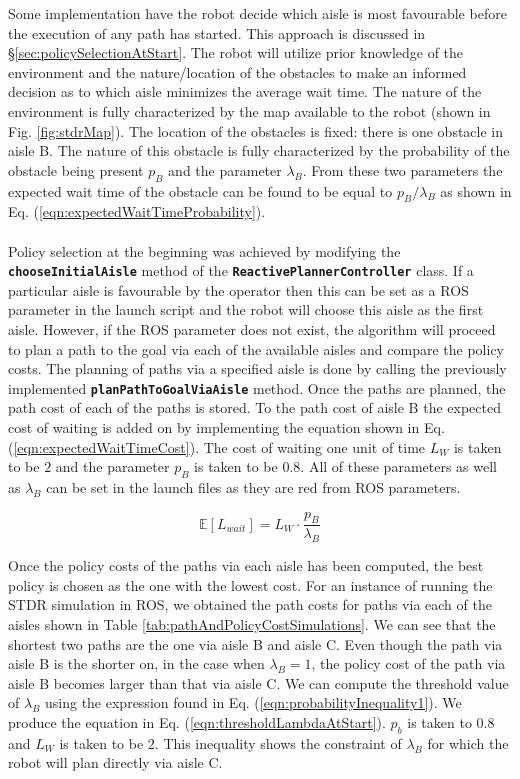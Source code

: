 \documentclass[a4paper,12pt]{article}
\begin{document}
		Some implementation have the robot decide which aisle is most favourable before the execution of any path has started. This approach is discussed in \S \ref{sec:policySelectionAtStart}. The robot will utilize prior knowledge of the environment and the nature/location of the obstacles to make an informed decision as to which aisle minimizes the average wait time. The nature of the environment is fully characterized by the map available to the robot (shown in Fig. \ref{fig:stdrMap}). The location of the obstacles is fixed: there is one obstacle in aisle B. The nature of this obstacle is fully characterized by the probability of the obstacle being present $p_B$ and the parameter $\lambda_B$. From these two parameters the expected wait time of the obstacle can be found to be equal to $p_B/\lambda_B$ as shown in Eq. (\ref{eqn:expectedWaitTimeProbability}).
		\\
		\\
		Policy selection at the beginning was achieved by modifying the \textbf{\texttt{chooseInitialAisle}} method of the \textbf{\texttt{ReactivePlannerController}} class. If a particular aisle is favourable by the operator then this can be set as a ROS parameter in the launch script and the robot will choose this aisle as the first aisle. However, if the ROS parameter does not exist, the algorithm will proceed to plan a path to the goal via each of the available aisles and compare the policy costs. The planning of paths via a specified aisle is done by calling the previously implemented \texttt{\textbf{planPathToGoalViaAisle}} method. Once the paths are planned, the path cost of each of the paths is stored. To the path cost of aisle B the expected cost of waiting is added on by implementing the equation shown in Eq. (\ref{eqn:expectedWaitTimeCost}). The cost of waiting one unit of time $L_W$ is taken to be $2$ and the parameter $p_B$ is taken to be $0.8$. All of these parameters as well as $\lambda_B$ can be set in the launch files as they are red from ROS parameters.
		
		\begin{equation}
			\mathbb{E}[L_{wait}]=L_W \cdot \frac{p_B}{\lambda_B}
		\label{eqn:expectedWaitTimeCost}
		\end{equation}
		
		Once the policy costs of the paths via each aisle has been computed, the best policy is chosen as the one with the lowest cost. For an instance of running the STDR simulation in ROS, we obtained the path costs for paths via each of the aisles shown in Table \ref{tab:pathAndPolicyCostSimulations}. We can see that the shortest two paths are the one via aisle B and aisle C. Even though the path via aisle B is the shorter on, in the case when $\lambda_B=1$, the policy cost of the path via aisle B becomes larger than that via aisle C. We can compute the threshold value of $\lambda_B$ using the expression found in Eq. (\ref{eqn:probabilityInequality1}). We produce the equation in Eq. (\ref{eqn:thresholdLambdaAtStart}). $p_b$ is taken to $0.8$ and $L_W$ is taken to be $2$. This inequality shows the constraint of $\lambda_B$ for which the robot will plan directly via aisle C.
		
\end{document}
